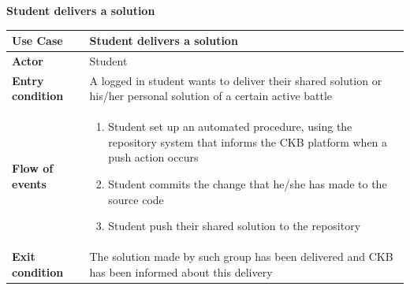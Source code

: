 \documentclass[../RASD.tex]{subfiles}
\begin{document}
        \textbf{Student delivers a solution}
        \begin{table}[ht]
            \begin{center}
                \begin{tabular}{|m{10em}|m{30em}|}
                \hline
                \textbf{Use Case} & Student delivers a solution\\
                \hline
                \textbf{Actor} & Student\\
                \hline
                \textbf{Entry condition} & A logged in student wants to deliver their shared solution  or his/her personal solution of a certain active battle\\
                \hline
                \textbf{Flow of events} & 
                    \begin{enumerate}
                        \item Student set up an automated procedure, using the repository system that informs the CKB platform when a push action occurs
                        \item Student commits the change that he/she has made to the source code
                        \item Student push their shared solution to the repository
                    \end{enumerate}\\
                \hline
                \textbf{Exit condition} & The solution made by such group has been delivered and CKB has been informed about this delivery\\
                \hline
                \end{tabular}
            \end{center}
        \end{table}\newpage
\end{document}
